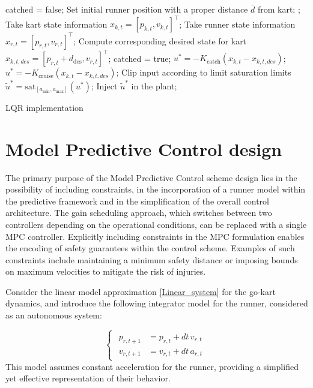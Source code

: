 \documentclass[a4paper,12pt,oneside]{book}
\begin{document}
\begin{algorithm}
\begin{algorithmic}[1]
	\State catched = false;
	\State Set initial runner position with a proper distance $\bar{d}$ from kart;
	;
		\State Take kart state information $x_{k,t} = [p_{k,t}, v_{k,t}]^\top$;
		\State Take runner state information $x_{r,t} = [p_{r,t}, v_{r,t}]^\top$;
		\State Compute corresponding desired state for kart $x_{k,t,des} = [p_{r,t} + d_{\text{des}}, v_{r,t}]^\top$;
			\State catched = true;
		\EndIf
			\State $u^* = - K_{\text{catch}} (x_{k,t} - x_{k,t,des}) $;
		\Else 
			\State $u^* = - K_{\text{cruise}} (x_{k,t} - x_{k,t,des}) $;
		\EndIf
		\State Clip input according to limit saturation limits $\tilde{u}^* = \text{sat}_{[a_{\min}, a_{\max}]} (u^*)$;
		\State Inject $\tilde{u}^*$ in the plant;
	\EndFor
\caption{LQR implementation}
\label{alg:LQR_sim_implementation}
\end{algorithmic}
\end{algorithm}


\section{Model Predictive Control design}
The primary purpose of the Model Predictive Control scheme design lies in the possibility of including constraints, in the incorporation of a runner model within the predictive framework and in the simplification of the overall control architecture.
The gain scheduling approach, which switches between two controllers depending on the operational conditions, can be replaced with a single MPC controller.
Explicitly including constraints in the MPC formulation enables the encoding of safety guarantees within the control scheme. 
Examples of such constraints include maintaining a minimum safety distance or imposing bounds on maximum velocities to mitigate the risk of injuries.

\bigskip
Consider the linear model approximation \eqref{Linear_system} for the go-kart dynamics, and introduce the following integrator model for the runner, considered as an autonomous system:

\begin{equation}
\begin{cases}
	\begin{aligned}
		p_{r,t+1} &= p_{r,t} + dt \, v_{r,t} \\
		v_{r,t+1} &= v_{r,t} + dt \, a_{r,t}
	\end{aligned}
\end{cases}
\label{Runner_model}
\end{equation}
This model assumes constant acceleration for the runner, providing a simplified yet effective representation of their behavior.
\end{document}

